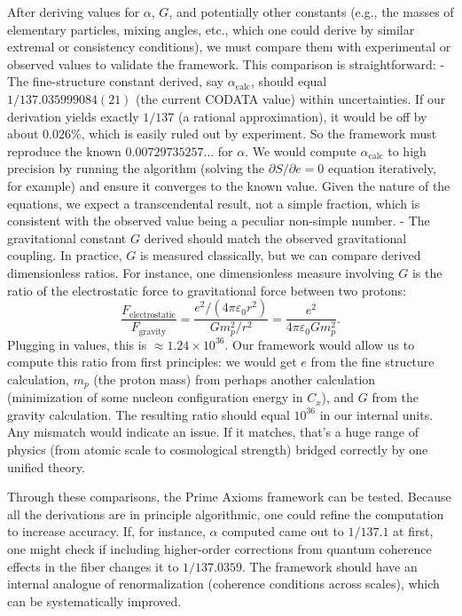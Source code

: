 \documentclass[11pt]{article}
\begin{document}
After deriving values for $\alpha$, $G$, and potentially other constants (e.g., the masses of elementary particles, mixing angles, etc., which one could derive by similar extremal or consistency conditions), we must compare them with experimental or observed values to validate the framework. This comparison is straightforward:
- The fine-structure constant derived, say $\alpha_{\mathrm{calc}}$, should equal $1/137.035999084(21)$ (the current CODATA value) within uncertainties. If our derivation yields exactly $1/137$ (a rational approximation), it would be off by about $0.026\%$, which is easily ruled out by experiment. So the framework must reproduce the known $0.00729735257\ldots$ for $\alpha$. We would compute $\alpha_{\mathrm{calc}}$ to high precision by running the algorithm (solving the $\partial S/\partial e=0$ equation iteratively, for example) and ensure it converges to the known value. Given the nature of the equations, we expect a transcendental result, not a simple fraction, which is consistent with the observed value being a peculiar non-simple number.
- The gravitational constant $G$ derived should match the observed gravitational coupling. In practice, $G$ is measured classically, but we can compare derived dimensionless ratios. For instance, one dimensionless measure involving $G$ is the ratio of the electrostatic force to gravitational force between two protons: 
\[ \frac{F_{\text{electrostatic}}}{F_{\text{gravity}}} = \frac{e^2/(4\pi\varepsilon_0 r^2)}{G m_p^2/r^2} = \frac{e^2}{4\pi\varepsilon_0 G m_p^2}. \]
Plugging in values, this is $\approx 1.24\times10^{36}$. Our framework would allow us to compute this ratio from first principles: we would get $e$ from the fine structure calculation, $m_p$ (the proton mass) from perhaps another calculation (minimization of some nucleon configuration energy in $C_x$), and $G$ from the gravity calculation. The resulting ratio should equal $10^{36}$ in our internal units. Any mismatch would indicate an issue. If it matches, that’s a huge range of physics (from atomic scale to cosmological strength) bridged correctly by one unified theory.

Through these comparisons, the Prime Axioms framework can be tested. Because all the derivations are in principle algorithmic, one could refine the computation to increase accuracy. If, for instance, $\alpha$ computed came out to $1/137.1$ at first, one might check if including higher-order corrections from quantum coherence effects in the fiber changes it to $1/137.0359$. The framework should have an internal analogue of renormalization (coherence conditions across scales), which can be systematically improved.
\end{document}
